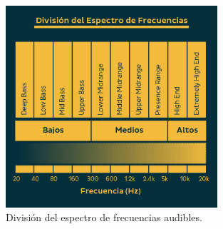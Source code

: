 \documentclass[a4paper]{article}
\begin{document}

\begin{figure}[H]
\centering
	\includegraphics[width=0.7\textwidth]{Imagenes/FrequencySpectrumDivision.png}
	\caption{División del espectro de frecuencias audibles.}
	\label{fig:divfreq}
\end{figure}
\end{document}
